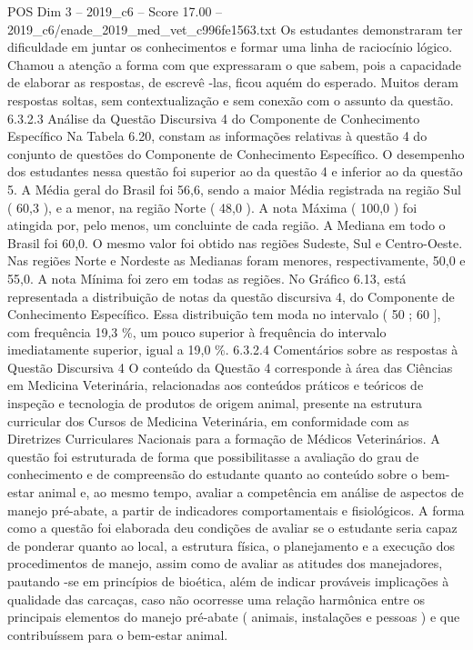 \begin{textsample}{POS Dim 3 – 2019\_c6 – Score 17.00 – 2019\_c6/enade\_2019\_med\_vet\_c996fe1563.txt}
Os estudantes demonstraram ter dificuldade em juntar os conhecimentos e formar uma linha de raciocínio lógico.
Chamou a atenção a forma com que expressaram o que sabem, pois a capacidade de elaborar as respostas, de escrevê -las, ficou aquém do esperado.
Muitos deram respostas soltas, sem contextualização e sem conexão com o assunto da questão. 6.3.2.3 Análise da Questão Discursiva 4 do Componente de Conhecimento Específico Na Tabela 6.20, constam as informações relativas à questão 4 do conjunto de questões do Componente de Conhecimento Específico.
O desempenho dos estudantes nessa questão foi superior ao da questão 4 e inferior ao da questão 5.
A Média geral do Brasil foi 56,6, sendo a maior Média registrada na região Sul ( 60,3 ), e a menor, na região Norte ( 48,0 ).
A nota Máxima ( 100,0 ) foi atingida por, pelo menos, um concluinte de cada região.
A Mediana em todo o Brasil foi 60,0.
O mesmo valor foi obtido nas regiões Sudeste, Sul e Centro-Oeste.
Nas regiões Norte e Nordeste as Medianas foram menores, respectivamente, 50,0 e 55,0.
A nota Mínima foi zero em todas as regiões.
No Gráfico 6.13, está representada a distribuição de notas da questão discursiva 4, do Componente de Conhecimento Específico.
Essa distribuição tem moda no intervalo ( 50 ; 60 ], com frequência 19,3 \%, um pouco superior à frequência do intervalo imediatamente superior, igual a 19,0 \%. 6.3.2.4 Comentários sobre as respostas à Questão Discursiva 4 O conteúdo da Questão 4 corresponde à área das Ciências em Medicina Veterinária, relacionadas aos conteúdos práticos e teóricos de inspeção e tecnologia de produtos de origem animal, presente na estrutura curricular dos Cursos de Medicina Veterinária, em conformidade com as Diretrizes Curriculares Nacionais para a formação de Médicos Veterinários.
A questão foi estruturada de forma que possibilitasse a avaliação do grau de conhecimento e de compreensão do estudante quanto ao conteúdo sobre o bem-estar animal e, ao mesmo tempo, avaliar a competência em análise de aspectos de manejo pré-abate, a partir de indicadores comportamentais e fisiológicos.
A forma como a questão foi elaborada deu condições de avaliar se o estudante seria capaz de ponderar quanto ao local, a estrutura física, o planejamento e a execução dos procedimentos de manejo, assim como de avaliar as atitudes dos manejadores, pautando -se em princípios de bioética, além de indicar prováveis implicações à qualidade das carcaças, caso não ocorresse uma relação harmônica entre os principais elementos do manejo pré-abate ( animais, instalações e pessoas ) e que contribuíssem para o bem-estar animal.

\end{textsample}
